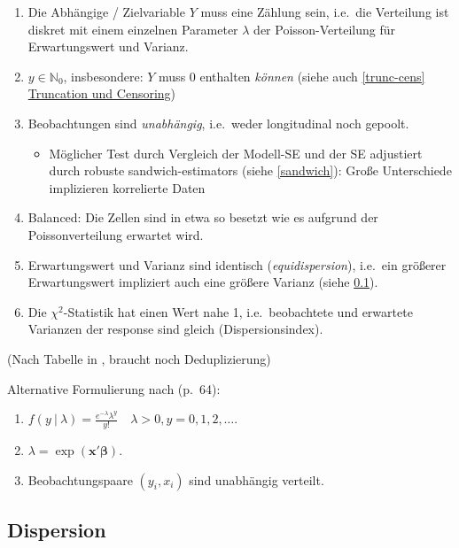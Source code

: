 \documentclass[ngerman,a4paper,]{scrartcl}
\providecommand{\tightlist}{%
  \setlength{\itemsep}{0pt}\setlength{\parskip}{0pt}}
\theoremstyle{definition}
\theoremstyle{definition}
\theoremstyle{definition}
\theoremstyle{remark}
\begin{document}
\begin{enumerate}
\def\labelenumi{\arabic{enumi}.}
\tightlist
\item
  Die Abhängige / Zielvariable \(Y\) muss eine Zählung sein, i.e.~die Verteilung ist diskret mit einem einzelnen Parameter \(\lambda\) der Poisson-Verteilung für Erwartungswert und Varianz.
\item
  \(y \in \mathbb{N}_0\), insbesondere: \(Y\) muss 0 enthalten \emph{können} (siehe auch \ref{trunc-cens} \protect\hyperlink{trunc-cens}{Truncation und Censoring})
\item
  Beobachtungen sind \emph{unabhängig}, i.e.~weder longitudinal noch gepoolt.

  \begin{itemize}
  \tightlist
  \item
    Möglicher Test durch Vergleich der Modell-SE und der SE adjustiert durch robuste sandwich-estimators (siehe \ref{sandwich}): Große Unterschiede implizieren korrelierte Daten
  \end{itemize}
\item
  Balanced: Die Zellen sind in etwa so besetzt wie es aufgrund der Poissonverteilung erwartet wird.
\item
  Erwartungswert und Varianz sind identisch (\emph{equidispersion}), i.e.~ein größerer Erwartungswert impliziert auch eine größere Varianz (siehe \ref{dispersion}).
\item
  Die \(\chi^2\)-Statistik hat einen Wert nahe 1, i.e.~beobachtete und erwartete Varianzen der response sind gleich (Dispersionsindex).
\end{enumerate}

(Nach Tabelle in \citep{hilbeModelingCountData2014}, braucht noch Deduplizierung)

Alternative Formulierung nach \citet{winkelmannEconometricAnalysisCount2010} (p.~64):

\begin{enumerate}
\def\labelenumi{\arabic{enumi}.}
\tightlist
\item
  \(f(y\ |\ \lambda) = \frac{e^{-\lambda} \lambda^y}{y!} \quad \lambda > 0, y = 0, 1, 2, \ldots\).
\item
  \(\lambda = \exp(\mathbf{x}' \boldsymbol{\beta})\).
\item
  Beobachtungspaare \((y_i, x_i)\) sind unabhängig verteilt.
\end{enumerate}

\hypertarget{dispersion}{%
\subsection{Dispersion}\label{dispersion}}
\end{document}

